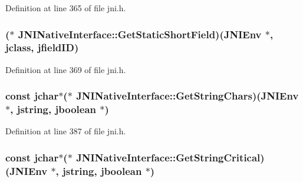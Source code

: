 Definition at line 365 of file jni.\-h.

\hypertarget{struct_j_n_i_native_interface_a4ddb7866f7a785f4eae0554a2f04c74b}{
\subsubsection[{Get\-Static\-Short\-Field}]{($\ast$ J\-N\-I\-Native\-Interface\-::\-Get\-Static\-Short\-Field)({\bf J\-N\-I\-Env} $\ast$, {\bf jclass}, {\bf jfield\-I\-D})}}\label{struct_j_n_i_native_interface_a4ddb7866f7a785f4eae0554a2f04c74b}


Definition at line 369 of file jni.\-h.

\hypertarget{struct_j_n_i_native_interface_ac7fc8b052a82f56940a9c6a6e0d0ea82}{
\subsubsection[{Get\-String\-Chars}]{\setlength{\rightskip}{0pt plus 5cm}const {\bf jchar}$\ast$($\ast$ J\-N\-I\-Native\-Interface\-::\-Get\-String\-Chars)({\bf J\-N\-I\-Env} $\ast$, {\bf jstring}, {\bf jboolean} $\ast$)}}\label{struct_j_n_i_native_interface_ac7fc8b052a82f56940a9c6a6e0d0ea82}


Definition at line 387 of file jni.\-h.

\hypertarget{struct_j_n_i_native_interface_a9758935f6844f0c483d51b36e5102624}{
\subsubsection[{Get\-String\-Critical}]{\setlength{\rightskip}{0pt plus 5cm}const {\bf jchar}$\ast$($\ast$ J\-N\-I\-Native\-Interface\-::\-Get\-String\-Critical)({\bf J\-N\-I\-Env} $\ast$, {\bf jstring}, {\bf jboolean} $\ast$)}}\label{struct_j_n_i_native_interface_a9758935f6844f0c483d51b36e5102624}


